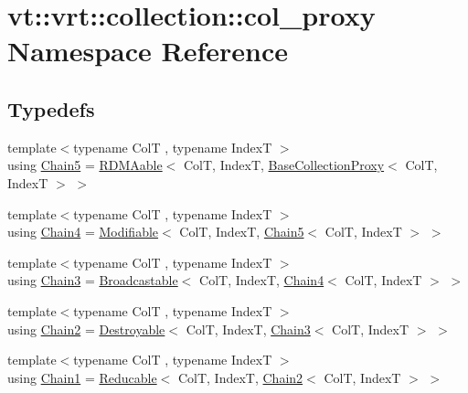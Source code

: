 \hypertarget{namespacevt_1_1vrt_1_1collection_1_1col__proxy}{}\section{vt\+:\+:vrt\+:\+:collection\+:\+:col\+\_\+proxy Namespace Reference}
\label{namespacevt_1_1vrt_1_1collection_1_1col__proxy}
\subsection*{Typedefs}
\begin{DoxyCompactItemize}
\item 
{\footnotesize template$<$typename ColT , typename IndexT $>$ }\\using \hyperlink{namespacevt_1_1vrt_1_1collection_1_1col__proxy_a96685f5884d57269c5c7dfe14dcc361b}{Chain5} = \hyperlink{structvt_1_1vrt_1_1collection_1_1_r_d_m_aable}{R\+D\+M\+Aable}$<$ ColT, IndexT, \hyperlink{structvt_1_1vrt_1_1collection_1_1_base_collection_proxy}{Base\+Collection\+Proxy}$<$ ColT, IndexT $>$ $>$
\item 
{\footnotesize template$<$typename ColT , typename IndexT $>$ }\\using \hyperlink{namespacevt_1_1vrt_1_1collection_1_1col__proxy_a0a277f3614b856c9e780e5446efd84f3}{Chain4} = \hyperlink{structvt_1_1vrt_1_1collection_1_1_modifiable}{Modifiable}$<$ ColT, IndexT, \hyperlink{namespacevt_1_1vrt_1_1collection_1_1col__proxy_a96685f5884d57269c5c7dfe14dcc361b}{Chain5}$<$ ColT, IndexT $>$ $>$
\item 
{\footnotesize template$<$typename ColT , typename IndexT $>$ }\\using \hyperlink{namespacevt_1_1vrt_1_1collection_1_1col__proxy_aa83ea97afbf21f975d02b933af0ee42c}{Chain3} = \hyperlink{structvt_1_1vrt_1_1collection_1_1_broadcastable}{Broadcastable}$<$ ColT, IndexT, \hyperlink{namespacevt_1_1vrt_1_1collection_1_1col__proxy_a0a277f3614b856c9e780e5446efd84f3}{Chain4}$<$ ColT, IndexT $>$ $>$
\item 
{\footnotesize template$<$typename ColT , typename IndexT $>$ }\\using \hyperlink{namespacevt_1_1vrt_1_1collection_1_1col__proxy_a0c21e18852e5deea513629fe02399bb5}{Chain2} = \hyperlink{structvt_1_1vrt_1_1collection_1_1_destroyable}{Destroyable}$<$ ColT, IndexT, \hyperlink{namespacevt_1_1vrt_1_1collection_1_1col__proxy_aa83ea97afbf21f975d02b933af0ee42c}{Chain3}$<$ ColT, IndexT $>$ $>$
\item 
{\footnotesize template$<$typename ColT , typename IndexT $>$ }\\using \hyperlink{namespacevt_1_1vrt_1_1collection_1_1col__proxy_a829dc1f247cb9518d83ccfb6ca9158a9}{Chain1} = \hyperlink{structvt_1_1vrt_1_1collection_1_1_reducable}{Reducable}$<$ ColT, IndexT, \hyperlink{namespacevt_1_1vrt_1_1collection_1_1col__proxy_a0c21e18852e5deea513629fe02399bb5}{Chain2}$<$ ColT, IndexT $>$ $>$
\end{DoxyCompactItemize}


